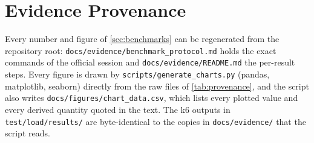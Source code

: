 \documentclass[10pt,a4paper]{article}
\newcommand{\code}[1]{\texttt{#1}}
\begin{document}
\appendix
\section{Evidence Provenance}
\label{sec:provenance}

Every number and figure of \cref{sec:benchmarks} can be regenerated from the
repository root: \code{docs/evidence/\allowbreak benchmark\_protocol.md} holds the
exact commands of the official session and
\code{docs/evidence/\allowbreak README.md} the per-result steps. Every figure is
drawn by \code{scripts/\allowbreak generate\_charts.py} (pandas, matplotlib, seaborn)
directly from the raw files of \cref{tab:provenance}, and the script also writes
\code{docs/figures/\allowbreak chart\_data.csv}, which lists every plotted value and
every derived quantity quoted in the text. The k6 outputs in
\code{test/load/results/} are byte-identical to the copies in
\code{docs/evidence/} that the script reads.
\end{document}

